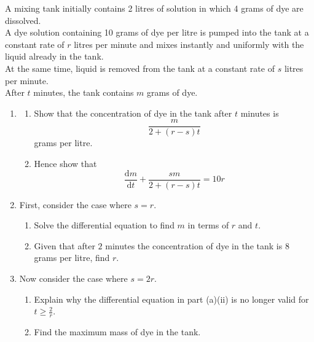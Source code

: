 \documentclass[leqno]{article}
\begin{document}
\begin{enumerate}[
  label=\textbf{\arabic*.},
  leftmargin=*,
  topsep=0pt,
  partopsep=0pt,
  parsep=0pt
]
\newpage

\questionitem

A mixing tank initially contains 2 litres of solution in which 4 grams of dye are dissolved. \\
A dye solution containing 10 grams of dye per litre is pumped into the tank at a constant rate of $r$ litres per minute and mixes instantly and uniformly with the liquid already in the tank. \\
At the same time, liquid is removed from the tank at a constant rate of $s$ litres per minute. \\
After $t$ minutes, the tank contains $m$ grams of dye. \\

\begin{enumerate}[label=\textbf{(\alph*)}]
  \item
  \begin{enumerate}[label=(\roman*)]
    \item Show that the concentration of dye in the tank after $t$ minutes is
    \[
    \frac{m}{2+(r-s)t}
    \]
    grams per litre.  \\
    \item Hence show that
    \[
    \frac{\mathrm{d}m}{\mathrm{d}t}+\frac{s m}{2+(r-s)t}=10r
    \]
  \end{enumerate}
  \item First, consider the case where $s=r$. \\
  \begin{enumerate}[label=(\roman*)]
    \item Solve the differential equation to find $m$ in terms of $r$ and $t$.  \\
    \item Given that after $2$ minutes the concentration of dye in the tank is $8$ grams per litre, find $r$.  \\
  \end{enumerate}
  \item Now consider the case where $s=2r$. \\
  \begin{enumerate}[label=(\roman*)]
    \item Explain why the differential equation in part (a)(ii) is no longer valid for $t\geq \frac{2}{r}$.  \\
    \item Find the maximum mass of dye in the tank.  \\
  \end{enumerate}
\end{enumerate}


\end{enumerate}
\end{document}

